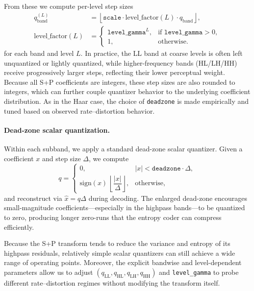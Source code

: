 From these we compute per-level step sizes
\begin{align}
    q_{\mathrm{band}}^{(L)} &= \left\lfloor
        \texttt{scale} \cdot \mathrm{level\_factor}(L) \cdot q_{\mathrm{band}}
    \right\rfloor, \\
    \mathrm{level\_factor}(L) &=
      \begin{cases}
        \texttt{level\_gamma}^{L}, & \text{if } \texttt{level\_gamma} > 0, \\
        1, & \text{otherwise}.
      \end{cases}
\end{align}
for each band and level $L$. In practice, the LL band at coarse levels is often
left unquantized or lightly quantized, while higher-frequency bands (HL/LH/HH)
receive progressively larger steps, reflecting their lower perceptual weight.
Because all S+P coefficients are integers, these step sizes are also rounded to
integers, which can further couple quantizer behavior to the underlying
coefficient distribution. As in the Haar case, the choice of \texttt{deadzone}
is made empirically and tuned based on observed rate--distortion behavior.

\paragraph{Dead-zone scalar quantization.}
Within each subband, we apply a standard dead-zone scalar quantizer. Given a
coefficient $x$ and step size $\Delta$, we compute
\begin{equation}
    q =
    \begin{cases}
      0, & |x| < \texttt{deadzone}\cdot\Delta, \\
      \mathrm{sign}(x)\,\left\lfloor \dfrac{|x|}{\Delta} \right\rfloor,
      & \text{otherwise,}
    \end{cases}
\end{equation}
and reconstruct via $\hat{x} = q\Delta$ during decoding. The enlarged dead-zone
encourages small-magnitude coefficients—especially in the highpass bands—to be
quantized to zero, producing longer zero-runs that the entropy coder can
compress efficiently.

Because the S+P transform tends to reduce the variance and entropy of its
highpass residuals, relatively simple scalar quantizers can still achieve a wide
range of operating points. Moreover, the explicit bandwise and level-dependent
parameters allow us to adjust $(q_{\mathrm{LL}}, q_{\mathrm{HL}},
q_{\mathrm{LH}}, q_{\mathrm{HH}})$ and \texttt{level\_gamma} to probe different
rate--distortion regimes without modifying the transform itself.
